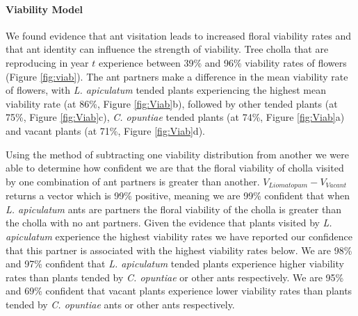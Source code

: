 \documentclass[11pt]{article}
\begin{document}
\paragraph{Viability Model}
We found evidence that ant visitation leads to increased floral viability rates and that ant identity can influence the strength of viability.
Tree cholla that are reproducing in year $t$ experience between 39\% and 96\% viability rates of flowers (Figure \ref{fig:viab}).
The ant partners make a difference in the mean viability rate of flowers, with \textit{L. apiculatum} tended plants experiencing the highest mean viability rate (at 86\%, Figure \ref{fig:Viab}b), followed by other tended plants (at 75\%, Figure \ref{fig:Viab}c), \textit{C. opuntiae} tended plants (at 74\%, Figure \ref{fig:Viab}a) and vacant plants (at 71\%, Figure \ref{fig:Viab}d).

Using the method of subtracting one viability distribution from another we were able to determine how confident we are that the floral viability of cholla visited by one combination of ant partners is greater than another. 
$V_{Liomatopum} - V_{Vacant}$ returns a vector which is 99\% positive, meaning we are 99\% confident that when \textit{L. apiculatum} ants are partners the floral viability of the cholla is greater than the cholla with no ant partners.
Given the evidence that plants visited by \textit{L. apiculatum} experience the highest viability rates we have reported our confidence that this partner is associated with the highest viability rates below. 
We are 98\% and 97\% confident that \textit{L. apiculatum} tended plants experience higher viability rates than plants tended by \textit{C. opuntiae} or other ants respectively.
We are 95\% and 69\% confident that vacant plants experience lower viability rates than plants tended by \textit{C. opuntiae} ants or other ants respectively.
\end{document}
